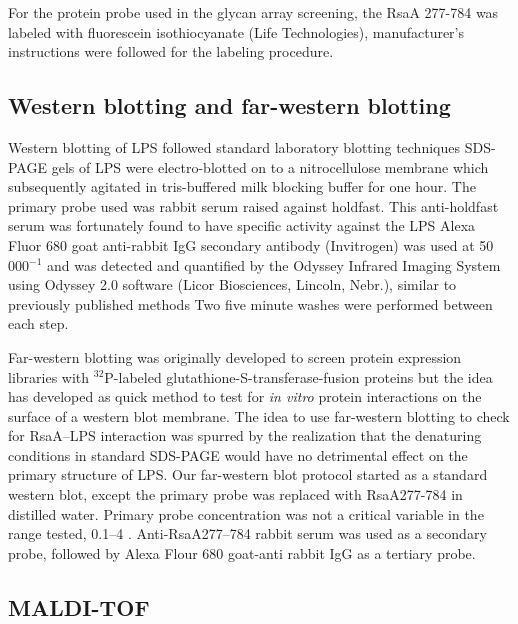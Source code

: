     For the protein probe used in the glycan array screening, the RsaA \del{}277-784 was labeled with fluorescein isothiocyanate (Life Technologies), manufacturer's instructions were followed for the labeling procedure.

        \subsection{Western blotting and far-western blotting} \label{sec:western-blotting-far}

    Western blotting of \ac{LPS} followed standard laboratory blotting techniques \ac{SDS-PAGE} gels of \ac{LPS} were electro-blotted on to a nitrocellulose membrane which subsequently agitated in tris-buffered milk blocking buffer for one hour. The primary probe used was rabbit serum raised against \caulobacter{} holdfast. This anti-holdfast serum was fortunately found to have specific activity against the \caulobacter{} \ac{LPS} Alexa Fluor 680 goat anti-rabbit IgG secondary antibody (Invitrogen) was used at 50\,000$^{-1}$ and was detected and quantified by the Odyssey Infrared Imaging System using Odyssey 2.0 software (Licor Biosciences, Lincoln, Nebr.), similar to previously published methods Two five minute washes were performed between each step.

Far-western blotting was originally developed to screen protein expression libraries with $^{32}$P-labeled glutathione-S-transferase-fusion proteins but the idea has developed as quick method to test for \textit{in vitro} protein interactions on the surface of a western blot membrane. The idea to use far-western blotting to check for RsaA--\ac{LPS} interaction was spurred by the realization that the denaturing conditions in standard \ac{SDS-PAGE} would have no detrimental effect on the primary structure of \ac{LPS}. Our far-western blot protocol started as a standard western blot, except the primary probe was replaced with RsaA\del{}277-784 in distilled water. Primary probe concentration was not a critical variable in the range tested, 0.1--4 \mgperml{}. Anti-RsaA\del{}277--784 rabbit serum was used as a secondary probe, followed by Alexa Flour 680 goat-anti rabbit IgG as a tertiary probe. 

    \subsection{\Acl{MALDI-TOF}}\label{sec:acmaldi-tof}
     
